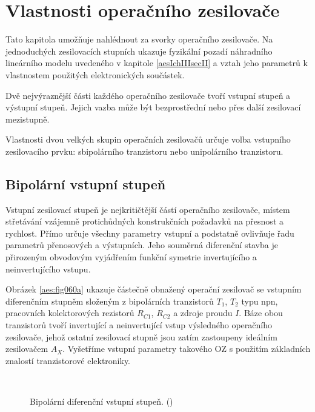   \section{Vlastnosti operačního zesilovače}\label{aesIchIIIsecIII}
    Tato kapitola umožňuje nahlédnout za svorky operačního zesilovače. Na jednoduchých zesilovacích
    stupních ukazuje fyzikální pozadí náhradního lineárního modelu uvedeného v kapitole
    \ref{aesIchIIIsecII} a vztah jeho parametrů k vlastnostem použitých elektronických součástek.

    Dvě nejvýraznější části každého operačního zesilovače tvoří vstupní stupeň a výstupní stupeň.
    Jejich vazba může být bezprostřední nebo přes další zesilovací mezistupně.

    Vlastnosti dvou velkých skupin operačních zesilovačů určuje volba vstupního zesilovacího prvku:
    sbipolárního tranzistoru nebo unipolárního tranzistoru.

    \subsection{Bipolární vstupní stupeň}\label{aesIchIIIsecIIIssecI}
      Vstupní zesilovací stupeň je nejkritičtější částí operačního zesilovače, místem střetávání
      vzájemně protichůdných konstrukčních požadavků na přesnost a rychlost. Přímo určuje všechny
      parametry vstupní a podstatně ovlivňuje řadu parametrů přenosových a výstupních. Jeho souměrná
      diferenční stavba je přirozeným obvodovým vyjádřením funkční symetrie invertujícího a
      neinvertujícího vstupu.

      Obrázek \ref{aes:fig060a} ukazuje částečně obnažený operační zesilovač se vstupním diferenčním
      stupněm složeným z bipolárních tranzistorů \(T_1\), \(T_2\) typu npn, pracovních kolektorových
      rezistorů \(R_{C1}\), \(R_{C2}\) a zdroje proudu \(I\). Báze obou tranzistorů tvoří
      invertující a neinvertující vstup výsledného operačního zesilovače, jehož ostatní zesilovací
      stupně jsou zatím zastoupeny ideálním zesilovačem \(A_X\). Vyšetříme vstupní parametry
      takového OZ s použitím základních znalostí tranzistorové elektroniky.

      \begin{figure}[ht!]  %
        \centering
          {}        \\                                              
          {}                                        
        \caption{Bipolární diferenční vstupní stupeň. (\cite[s.~37]{Dostal})}
        \label{aes:fig060}
      \end{figure}


